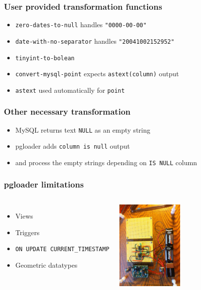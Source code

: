 \documentclass{beamer}
\begin{document}
\begin{frame}[fragile]
  \frametitle{User provided transformation functions}
  
  \vfill

  \begin{itemize}
  \item \texttt{zero-dates-to-null} handles \texttt{"0000-00-00"}
  \item \texttt{date-with-no-separator} handles \texttt{"20041002152952"}
  \item \texttt{tinyint-to-bolean}
  \item \texttt{convert-mysql-point} expects \texttt{astext(column)} output
  \item \texttt{astext} used automatically for \texttt{point}
  \end{itemize}
\end{frame}

\begin{frame}[fragile]
  \frametitle{Other necessary transformation}
  
  \vfill

  \begin{itemize}
  \item MySQL returns text \texttt{NULL} as an empty string
  \item pgloader adds \texttt{column is null} output
  \item and process the empty strings depending on \texttt{IS NULL} column
  \end{itemize}
\end{frame}

\begin{frame}[fragile]
  \frametitle{pgloader limitations}
  
  \vfill

\begin{columns}

  \begin{itemize}
  \item Views
  \item Triggers
  \item \texttt{ON UPDATE CURRENT\_TIMESTAMP}
  \item Geometric datatypes
  \end{itemize}

\begin{center}
  \includegraphics[height=12em]{niy.jpg}
\end{center}
\end{columns}
\end{frame}
\end{document}
